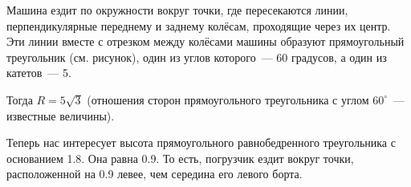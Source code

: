 \begin{itemize}

\itA Машина ездит по окружности вокруг точки, где пересекаются линии, перпендикулярные переднему и заднему колёсам, проходящие через их центр. Эти линии вместе с отрезком между колёсами машины образуют прямоугольный треугольник (см. рисунок), один из углов которого~— 60 градусов, а один из катетов~— \SI{5}{}.

Тогда $R = 5 \sqrt{3}$ (отношения сторон прямоугольного треугольника с углом $60^\circ$~— известные величины).

\begin{center}
\end{center}

\itB Теперь нас интересует высота прямоугольного равнобедренного треугольника с основанием \SI{1.8}{}. Она равна \SI{0.9}{}. То есть, погрузчик ездит вокруг точки, расположенной на \SI{0.9}{} левее, чем середина его левого борта.


\end{itemize}
